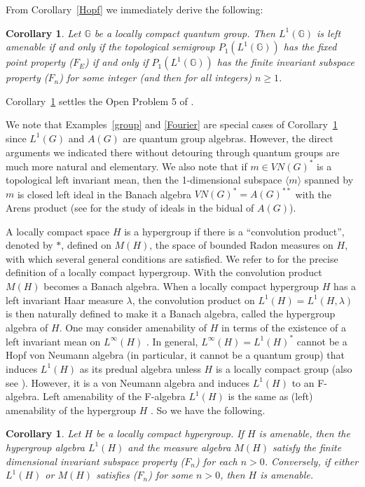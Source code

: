 \documentclass{tran-l}
\numberwithin{equation}{section}
\newtheorem{cor}[thm]{Corollary}
\theoremstyle{definition}
\theoremstyle{remark}
\begin{document}
 From Corollary~\ref{Hopf} we immediately derive the following:

\begin{cor}\label{quantum}
Let ${\mathbb G}$ be a locally compact quantum group. Then $L^1({\mathbb G})$ is left amenable if and only if the topological semigroup $P_1(L^1({\mathbb G}))$ has the fixed point property ($F_E$) if and only if $P_1(L^1({\mathbb G}))$ has the finite invariant subspace property ($F_n$) for some integer (and then for all integers) $n\geq 1$.
\end{cor}

 Corollary~\ref{quantum} settles the Open Problem 5 of \cite{Lau_finite}.
 
 We note that Examples~\ref{group} and \ref{Fourier} are special cases of Corollary~\ref{quantum} since $L^1(G)$ and $A(G)$ are quantum group algebras. However, the direct arguments we indicated there without detouring through quantum groups are much more natural and elementary. We also note that if $m\in VN(G)^*$ is a topological left invariant mean, then the 1-dimensional subspace $\langle m\rangle$ spanned by $m$ is closed left ideal in the Banach algebra $VN(G)^*=A(G)^{**}$ with the Arens product (see \cite{F-M, F-M-N} for the study of ideals in the bidual of $A(G)$).

A locally compact space $H$ is a hypergroup if there is a ``convolution product'', denoted by $*$, defined on $M(H)$, the space of bounded Radon measures on $H$, with which several general conditions are satisfied. We refer to \cite{Bloom-Heyer} for the precise definition of a locally compact hypergroup.  With the convolution product $M(H)$ becomes a Banach algebra. When a locally compact hypergroup $H$ has a left invariant Haar measure $\lambda$, the convolution product on $L^1(H)=L^1(H,\lambda)$ is then naturally defined to make it a Banach algebra, called the hypergroup algebra of $H$. One may consider amenability of $H$ in terms of the existence of a left invariant mean on $L^\infty(H)$ \cite{Skan}. 
In general, $L^\infty(H)= L^1(H)^*$ cannot be a Hopf von Neumann algebra (in particular, it cannot be a quantum group) that induces $L^1(H)$ as its predual algebra unless $H$ is a locally compact group \cite{Willson} (also see \cite{Willson2}). However, it is a von Neumann algebra and induces $L^1(H)$ to an F-algebra. Left amenability of the F-algebra $L^1(H)$ is the same as (left) amenability of the hypergroup $H$ \cite{Skan}. So we have the following.

\begin{cor}\label{hyper}
Let $H$ be a locally compact hypergroup. If $H$ is amenable, then the hypergroup algebra $L^1(H)$ and the measure algebra $M(H)$ satisfy the finite dimensional invariant subspace property ($F_n$) for each $n>0$. Conversely, if either $L^1(H)$ or $M(H)$ satisfies ($F_n$) for some $n>0$, then $H$ is amenable.
\end{cor}
\end{document}
